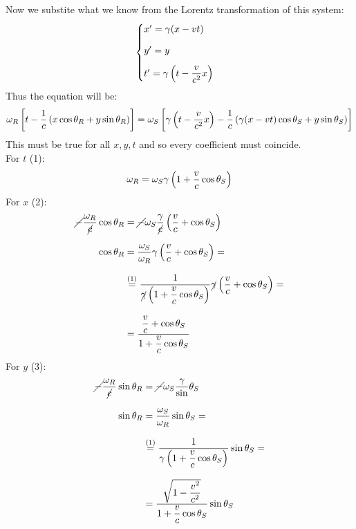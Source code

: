 Now we substite what we know from the Lorentz transformation of this system:
\begin{equation}
  \begin{cases}
    x' = \gamma(x - vt) \\[8pt]
    y' = y \\[8pt]
    t' = \gamma\left(t - \dfrac{v}{c^2}x\right)
  \end{cases}
\end{equation}
Thus the equation will be:
\begin{equation}
  \omega_{R}\left[t-\dfrac{1}{c}\left(x\cos\theta_R + y\sin\theta_R\right)\right] = \omega_{S}\left[\gamma\left(t - \dfrac{v}{c^2}x\right) - \dfrac{1}{c}\left(\gamma(x - vt)\cos\theta_S + y\sin\theta_S\right)\right]
\end{equation}
This must be true for all $x,y,t$ and so every coefficient must coincide.\\
For $t$ (1):
\begin{equation}
  \omega_R  = \omega_S \gamma\left(1 + \dfrac{v}{c}\cos \theta_S\right)
\end{equation}
For $x$ (2):
\begin{equation}
  \begin{split}
    \cancel{-}\dfrac{\omega_R}{\cancel{c}}\cos \theta_R &= \cancel{-}\omega_S \dfrac{\gamma}{\cancel{c}}\left(\dfrac{v}{c} + \cos \theta_S\right)\\[8pt]
    \cos \theta_R  &= \dfrac{\omega_S}{\omega_R} \gamma \left(\dfrac{v}{c} + \cos \theta_S\right) =\\[8pt]
    &\overset{(1)}{=} \dfrac{1}{\cancel{\gamma}\left(1 + \dfrac{v}{c}\cos \theta_S\right)} \cancel{\gamma} \left(\dfrac{v}{c} + \cos \theta_S\right) =\\[8pt]
    &= \dfrac{\dfrac{v}{c} + \cos \theta_S}{1 + \dfrac{v}{c}\cos \theta_S}
  \end{split}
\end{equation}
For $y$ (3):
\begin{equation}
  \begin{split}
    \cancel{-}\dfrac{\omega_R}{\cancel{c}}\sin \theta_R &= \cancel{-}\omega_S \dfrac{\gamma}\sin \theta_S\\[8pt]
    \sin \theta_R &= \dfrac{\omega_S}{\omega_R}\sin \theta_S = \\[8pt]
    &\overset{(1)}{=} \dfrac{1}{\gamma\left(1 + \dfrac{v}{c}\cos \theta_S\right)}\sin \theta_S = \\[8pt]
    &= \dfrac{\sqrt{1-\dfrac{v^2}{c^2}}}{1 + \dfrac{v}{c}\cos \theta_S}\sin \theta_S
  \end{split}
\end{equation}
